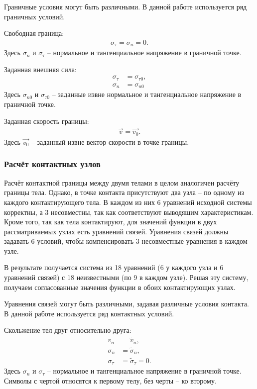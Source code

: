 Граничные условия могут быть различными. В данной работе используется ряд граничных условий.

Свободная граница:
\begin{align}
\sigma_\tau=\sigma_n=0.
\end{align}
Здесь $\sigma_n$ и $\sigma_\tau$ -- нормальное и тангенциальное напряжение в граничной точке.

Заданная внешняя сила:
\begin{align}
\sigma_\tau &= \sigma_{\tau 0}, \nonumber\\
\sigma_n &= \sigma_{n 0}
\end{align}
Здесь $\sigma_{n 0}$ и $\sigma_{\tau 0}$ -- заданные извне нормальное и тангенциальное напряжение в граничной точке.

Заданная скорость границы:
\begin{align}
\vec{v} = \vec{v_0}.
\end{align}
Здесь $\vec{v_0}$ -- заданный извне вектор скорости в точке границы.


\subsubsection{Расчёт контактных узлов}

Расчёт контактной границы между двумя телами в целом аналогичен расчёту границы тела. Однако, в точке контакта присутствуют два узла -- по одному из каждого контактирующего тела. В каждом из них 6 уравнений исходной системы корректны, а 3 несовместны, так как соответствуют выводящим характеристикам. Кроме того, так как тела контактируют, для значений функции в двух рассматриваемых узлах есть уравнений связей. Уравнения связей должны задавать 6 условий, чтобы компенсировать 3 несовместные уравнения в каждом узле.

В результате получается система из 18 уравнений (6 у каждого узла и 6 уравнений связей) с 18 неизвестными (по 9 в каждом узле). Решая эту систему, получаем согласованные значения функции в обоих контактирующих узлах.

Уравнения связей могут быть различными, задавая различные условия контакта. В данной работе используется ряд контактных условий.

Скольжение тел друг относительно друга:
\begin{align}
v_n&=\tilde{v}_n,\nonumber\\
\sigma_n&=\tilde{\sigma}_n,\nonumber\\
\sigma_\tau&=\tilde{\sigma}_\tau=0.
\end{align}
Здесь $\sigma_n$ и $\sigma_\tau$ -- нормальное и тангенциальное напряжение в граничной точке. Символы с чертой относятся к первому телу, без черты -- ко второму.

